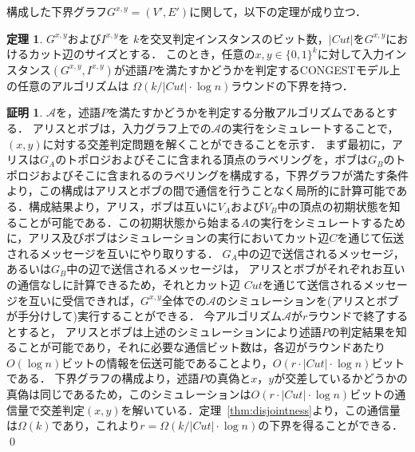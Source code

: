 \documentclass[12pt]{thesis}
\newcommand{\CONGEST}{\textsf{CONGEST}}
\theoremstyle{definition}
\newtheorem{theorem}{定理}[chapter]
\newtheorem*{prf*}{証明}
\begin{document}
構成した下界グラフ$G^{x, y} = (V', E')$に関して，以下の定理が成り立つ．
\begin{theorem}
$G^{x,y}$および$I^{x,y}$を
$k$を交叉判定インスタンスのビット数，$|Cut|$を$G^{x, y}$におけるカット辺のサイズとする．
このとき，任意の$x, y \in \{0, 1\}^k$に対して入力インスタンス$(G^{x, y}, I^{x,y})$が述語$P$を満たすかどうかを判定する{\CONGEST}モデル上の任意のアルゴリズムは
$\Omega (k / |Cut| \cdot \log n)$ラウンドの下界を持つ．
\label{lower}
\end{theorem}
\begin{prf*}
$\mathcal{A}$を，述語$P$を満たすかどうかを判定する分散アルゴリズムであるとする．
アリスとボブは，入力グラフ上での$\mathcal{A}$の実行をシミュレートすることで，
$(x, y)$に対する交差判定問題を解くことができることを示す．
まず最初に，アリスは$G_{A}$のトポロジおよびそこに含まれる頂点のラベリングを，ボブは$G_{B}$のトポロジおよびそこに含まれるのラベリングを構成する，下界グラフが満たす条件より，この構成はアリスとボブの間で通信を行うことなく局所的に計算可能である．構成結果より，アリス，ボブは互いに$V_A$および$V_B$中の頂点の初期状態を知ることが可能である．この初期状態から始まる$A$の実行をシミュレートするために，アリス及びボブはシミュレーションの実行においてカット辺$C$を通じて伝送されるメッセージを互いにやり取りする．
$G_{A}$中の辺で送信されるメッセージ，あるいは$G_{B}$中の辺で送信されるメッセージは，
アリスとボブがそれぞれお互いの通信なしに計算できるため，それとカット辺
$Cut$を通じて送信されるメッセージを互いに受信できれば，$G^{x,y}$全体での$\mathcal{A}$のシミュレーションを(アリスとボブが手分けして)実行することができる．
今アルゴリズム$\mathcal{A}$が$r$ラウンドで終了するとすると，
アリスとボブは上述のシミュレーションにより述語$P$の判定結果を知ることが可能であり，それに必要な通信ビット数は，各辺がラウンドあたり$O(\log n)$ビットの情報を伝送可能であることより，$O(r \cdot |Cut| \cdot \log n)$ビットである．
下界グラフの構成より，述語$P$の真偽と$x$，$y$が交差しているかどうかの真偽は同じであるため，このシミュレーションは$O(r \cdot |Cut| \cdot \log n)$ビットの通信量で交差判定$(x,y)$を解いている．定理~\ref{thm:disjointness}より，この通信量は$\Omega(k)$であり，これより$r = \Omega (k / |Cut| \cdot \log n)$の下界を得ることができる．
\qed
\end{prf*}
\end{document}
